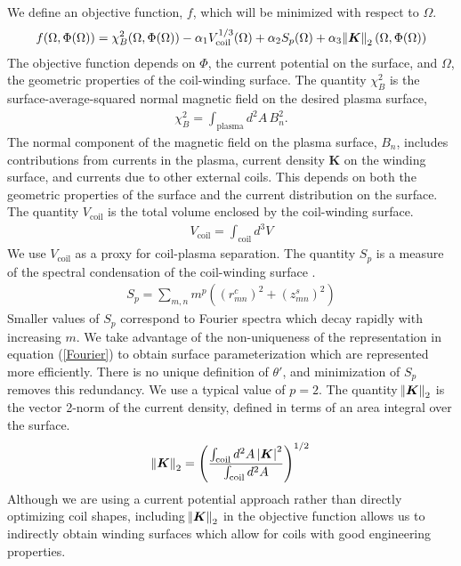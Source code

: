 \documentclass[aps,unsortedaddress]{revtex4-1}
\begin{document}
We define an objective function, $f$, which will be minimized with respect to $\Omega$. 
\begin{gather}
f(\Omega, \Phi(\Omega))  = \chi^2_B(\Omega, \Phi(\Omega)) - \alpha_1 V_{\text{coil}}^{1/3}(\Omega) + \alpha_2 S_p(\Omega) + \alpha_3  \norm{\bm{K}}_2(\Omega, \Phi(\Omega))
\label{objective_function}
\end{gather}
The objective function depends on $\Phi$, the current potential on the surface, and $\Omega$, the geometric properties of the coil-winding surface. The quantity $\chi^2_B$ is the surface-average-squared normal magnetic field on the desired plasma surface,
\begin{gather}
\chi^2_B = \int_{\text{plasma}} d^2 A \, B_n^2.
\label{chi2_B}
\end{gather}
The normal component of the magnetic field on the plasma surface, $B_n$, includes contributions from currents in the plasma, current density $\bm{K}$ on the winding surface, and currents due to other external coils. This depends on both the geometric properties of the surface and the current distribution on the surface. The quantity $V_{\text{coil}}$ is the total volume enclosed by the coil-winding surface.
\begin{gather}
V_{\text{coil}} = \int_{\text{coil}} d^3 V
\end{gather}
We use $V_{\text{coil}}$ as a proxy for coil-plasma separation. The quantity $S_p$ is a measure of the spectral condensation of the coil-winding surface \cite{Hirshman1985}. 
\begin{gather}
S_p = \sum_{m,n} m^{p} \left( (r_{mn}^c)^2 + (z_{mn}^s)^2 \right)
\end{gather}
Smaller values of $S_p$ correspond to Fourier spectra which decay rapidly with increasing $m$. We take advantage of the non-uniqueness of the representation in equation (\ref{Fourier}) to obtain surface parameterization which are represented more efficiently. There is no unique definition of $\theta'$,
and minimization of $S_p$ removes this redundancy.
We use a typical value of $p=2$. The quantity $\norm{\bm{K}}_2$ is the vector 2-norm of the current density, defined in terms of an area integral over the surface. 
\begin{gather}
\norm{\bm{K}}_2 = \left( \frac{\int_{\text{coil}} d^2 A \, \abs{\bm{K}}^2}{\int_{\text{coil}} d^2 A}  \right)^{1/2}
\end{gather}
Although we are using a current potential approach rather than directly optimizing coil shapes, including $\norm{\bm{K}}_2$ in the objective function allows us to indirectly obtain winding surfaces which allow for coils with good engineering properties. 
\end{document}
